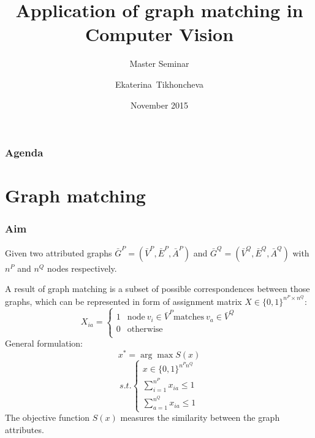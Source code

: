 \documentclass[hyperref={pdfpagelabels=false}]{beamer}
\title[Application of graph matching in Computer Vision]
	{Application of graph matching in Computer Vision}
\subtitle{Master Seminar}
\author[E.~Tikhoncheva] %
	{Ekaterina~Tikhoncheva}
\institute[Universities Here and There] %
	{University of Heidelberg\\
	Faculty of Mathematics and Computer Science \\
	Computer Vision group \\
	at\\
	Heidelberg Collaboratory for Image Processing
}
\date[2015]{November 2015}
\begin{document}
\begin{frame}
\titlepage
\end{frame}
\begin{frame}
\frametitle{Agenda}
\tableofcontents
\end{frame} 
\section{Graph matching} 
\begin{frame}
\frametitle{Aim}


\end{frame}
\begin{frame}
Given two attributed graphs $\bar{G}^P=(\bar{V}^P, \bar{E}^P, \bar{A}^P)$ and $\bar{G}^Q=(\bar{V}^Q, \bar{E}^Q, \bar{A}^Q)$ with $n^P$ and $n^Q$ nodes respectively.

A result of graph matching is a subset of possible correspondences between those graphs, which can be represented in form of assignment matrix $X\in\{0,1\}^{n^P\times n^Q}$:
$$X_{ia} = \begin{cases} 1 & \mbox{node}\ v_i\in \bar{V}^P \mbox{matches}\ v_a \in \bar{V}^Q \\
						 0 & \mbox{otherwise} \\
			\end{cases}$$
General formulation:
$$x^* = \arg\max S(x)$$
$$ s.t. \begin{cases}
									x\in\{0,1\}^{n^Pn^Q} \\
								 \sum_{i=1}^{n^P}x_{ia}\le 1 \\
								 \sum_{a=1}^{n^Q}x_{ia}\le 1  \end{cases}$$
The objective function $S(x)$ measures the similarity between the graph attributes. 
\end{frame} 

\end{document}
